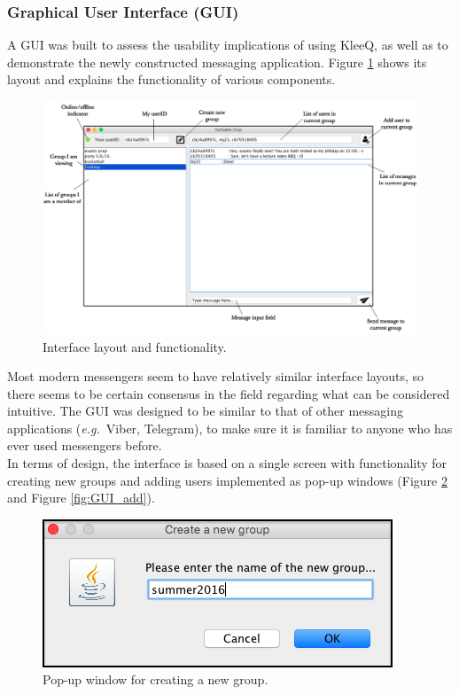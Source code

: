 \documentclass[a4paper, twoside, 12pt]{report}
\begin{document}
\subsubsection{Graphical User Interface (GUI)}
A GUI was built to assess the usability implications of using KleeQ, as well as to demonstrate the newly constructed messaging application. Figure \ref{fig:GUI} shows its layout and explains the functionality of various components.


\begin{figure}[H]
    \captionsetup{width=0.84\textwidth}
    \centering
    \includegraphics[width=0.98\linewidth]{pics/GUI.png}
    \caption{\label{fig:GUI} Interface layout and functionality.}
\end{figure}
Most modern messengers seem to have relatively similar interface layouts, so there seems to be certain consensus in the field regarding what can be considered intuitive. The GUI was designed to be similar to that of other messaging applications (\textit{e.g.}~Viber, Telegram), to make sure it is familiar to anyone who has ever used messengers before. \\

In terms of design, the interface is based on a single screen with functionality for creating new groups and adding users implemented as pop-up windows (Figure \ref{fig:GUI_create} and Figure \ref{fig:GUI_add}).

\begin{figure}[H]
    \captionsetup{width=0.84\textwidth}
    \centering
    \includegraphics[width=0.5\linewidth]{pics/GUI_create.png}
    \caption{\label{fig:GUI_create} Pop-up window for creating a new group.}
\end{figure}
\end{document}
